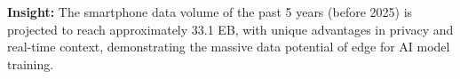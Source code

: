 \vspace{-0.5cm}
\begin{insights}
    \textbf{Insight:} The smartphone data volume of the past 5 years (before 2025) is projected to reach approximately 33.1 EB, with unique advantages in privacy and real-time context, demonstrating the massive data potential of edge for AI model training.
\end{insights}
   

